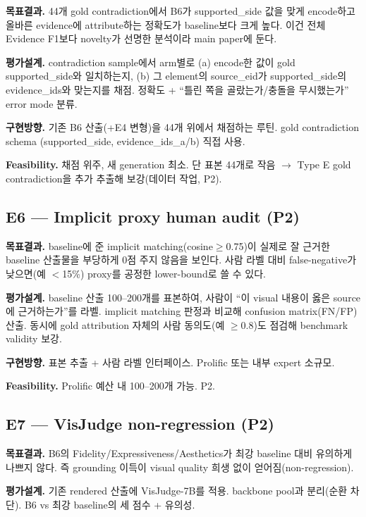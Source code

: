 \documentclass[11pt]{article}
\begin{document}
\textbf{목표결과.} 44개 gold contradiction에서 B6가 supported\_side 값을 맞게 encode하고 올바른
evidence에 attribute하는 정확도가 baseline보다 크게 높다. 이건 전체 Evidence F1보다 novelty가
선명한 분석이라 main paper에 둔다.

\textbf{평가설계.} contradiction sample에서 arm별로 (a) encode한 값이 gold supported\_side와
일치하는지, (b) 그 element의 source\_eid가 supported\_side의 evidence\_ids와 맞는지를 채점.
정확도 + ``틀린 쪽을 골랐는가/충돌을 무시했는가'' error mode 분류.

\textbf{구현방향.} 기존 B6 산출(+E4 변형)을 44개 위에서 채점하는 루틴. gold contradiction schema
(supported\_side, evidence\_ids\_a/b) 직접 사용.

\textbf{Feasibility.} 채점 위주, 새 generation 최소. 단 표본 44개로 작음 $\rightarrow$ Type E
gold contradiction을 추가 추출해 보강(데이터 작업, P2).

\subsection{E6 — Implicit proxy human audit (P2)}

\textbf{목표결과.} baseline에 준 implicit matching(cosine$\geq$0.75)이 실제로 잘 근거한 baseline
산출물을 부당하게 0점 주지 않음을 보인다. 사람 라벨 대비 false-negative가 낮으면(예 $<$15\%)
proxy를 공정한 lower-bound로 쓸 수 있다.

\textbf{평가설계.} baseline 산출 100--200개를 표본하여, 사람이 ``이 visual 내용이 옳은 source에
근거하는가''를 라벨. implicit matching 판정과 비교해 confusion matrix(FN/FP) 산출. 동시에 gold
attribution 자체의 사람 동의도(예 $\geq$0.8)도 점검해 benchmark validity 보강.

\textbf{구현방향.} 표본 추출 + 사람 라벨 인터페이스. Prolific 또는 내부 expert 소규모.

\textbf{Feasibility.} Prolific 예산 내 100--200개 가능. P2.

\subsection{E7 — VisJudge non-regression (P2)}

\textbf{목표결과.} B6의 Fidelity/Expressiveness/Aesthetics가 최강 baseline 대비 유의하게 나쁘지
않다. 즉 grounding 이득이 visual quality 희생 없이 얻어짐(non-regression).

\textbf{평가설계.} 기존 rendered 산출에 VisJudge-7B를 적용. backbone pool과 분리(순환 차단).
B6 vs 최강 baseline의 세 점수 + 유의성.
\end{document}
